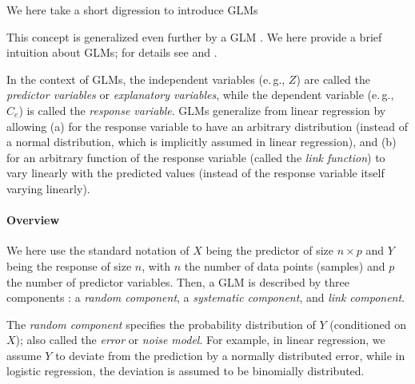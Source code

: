We here take a short digression to introduce \acfp{GLM}


This concept is generalized even further by a \acf{GLM} \cite{Nelder1972,McCullagh1989}.
We here provide a brief intuition about \acp{GLM}; for details see \cite{McCullagh1989} and \cite{Agresti2018}.



In the context of \acp{GLM},
the independent variables (e.\,g., $Z$) are called the \emph{predictor variables} or \emph{explanatory variables},
while the dependent variable (e.\,g., $C_e$) is called the \emph{response variable}.
\acp{GLM} generalize from linear regression by allowing
(a) for the response variable to have an arbitrary distribution
(instead of a normal distribution, which is implicitly assumed in linear regression),
and (b) for an arbitrary function of the response variable (called the \emph{link function})
to vary linearly with the predicted values (instead of the response variable itself varying linearly).


\paragraph{Overview}
\label{sec:Factorization:sub:Methods:sub:GLMs:par:Overview}

We here use the standard notation of $X$ being the predictor of size $n \times p$ and $Y$ being the response of size $n$,
with $n$ the number of data points (samples) and $p$ the number of predictor variables.
Then, a \ac{GLM} is described by three components \cite{McCullagh1989}:
a \emph{random component}, a \emph{systematic component}, and \emph{link component}.

The \emph{random component} specifies the probability distribution of $Y$ (conditioned on $X$);
also called the \emph{error} or \emph{noise model}.
For example, in linear regression, we assume $Y$ to deviate from the prediction by a normally distributed error,
while in logistic regression, the deviation is assumed to be binomially distributed.

